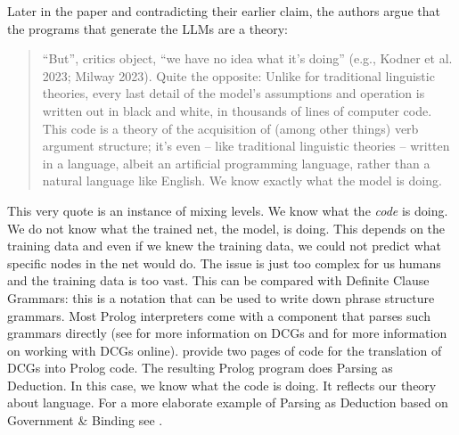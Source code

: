Later in the paper and contradicting their earlier claim, the authors argue that the programs that generate the LLMs are a theory:
\begin{quote}
``But'', critics object, ``we have no idea what it's doing'' (e.g., Kodner et al. 2023; Milway
2023). Quite the opposite: Unlike for traditional linguistic theories, every last detail of the
model's assumptions and operation is written out in black and white, in thousands of lines of
computer code. This code is a theory of the acquisition of (among other things) verb argument
structure; it's even -- like traditional linguistic theories -- written in a language, albeit an
artificial programming language, rather than a natural language like English. We know exactly what
the model is doing.  \citep[--40]{AmbridgeBlything2024a}
\end{quote}
This very quote is an instance of mixing levels. We know what the \emph{code} is doing. We do not
know what the trained net, the model, is doing. This depends on the training data and even if we
knew the training data, we could not predict what specific nodes in the net would do. The issue is
just too complex for us humans and the training data is too vast. This can be compared with Definite
Clause Grammars: this is a notation that can be used to write down phrase structure grammars. Most
Prolog interpreters come with a component that parses such grammars directly (see
\citealt[Chapter~9]{CM2003a} for more information on DCGs and \citealt[Task 10 on
p.\,81]{MuellerGT-Eng5} for more information on working with DCGs online). \citet[268--270]{CM2003a}
provide two pages of code for the translation of DCGs into Prolog code. The resulting Prolog program
does Parsing as Deduction. In this case, we know what the code is doing. It reflects our theory
about language. For a more elaborate example of Parsing as Deduction based on Government \& Binding
see . 


